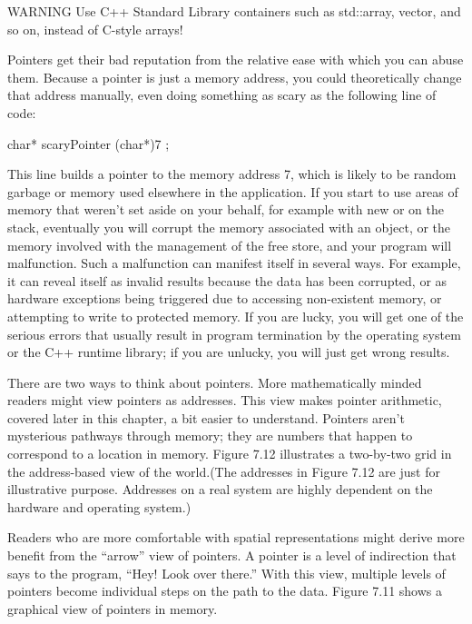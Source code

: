 \begin{myWarning}{WARNING}
Use C++ Standard Library containers such as std::array, vector, and so on, instead of C-style arrays!
\end{myWarning}


Pointers get their bad reputation from the relative ease with which you can abuse them. Because a pointer is just a memory address, you could theoretically change that address manually, even doing something as scary as the following line of code:

\begin{cpp}
char* scaryPointer { (char*)7 };
\end{cpp}

This line builds a pointer to the memory address 7, which is likely to be random garbage or memory used elsewhere in the application. If you start to use areas of memory that weren’t set aside on your behalf, for example with new or on the stack, eventually you will corrupt the memory associated with an object, or the memory involved with the management of the free store, and your program will malfunction. Such a malfunction can manifest itself in several ways. For example, it can reveal itself as invalid results because the data has been corrupted, or as hardware exceptions being triggered due to accessing non-existent memory, or attempting to write to protected memory. If you are lucky, you will get one of the serious errors that usually result in program termination by the operating system or the C++ runtime library; if you are unlucky, you will just get wrong results.


There are two ways to think about pointers. More mathematically minded readers might view pointers as addresses. This view makes pointer arithmetic, covered later in this chapter, a bit easier to understand. Pointers aren’t mysterious pathways through memory; they are numbers that happen to correspond to a location in memory. Figure 7.12 illustrates a two-by-two grid in the address-based view of the world.(The addresses in Figure 7.12 are just for illustrative purpose. Addresses on a real system are highly dependent on the hardware and operating system.)


Readers who are more comfortable with spatial representations might derive more benefit from the “arrow” view of pointers. A pointer is a level of indirection that says to the program, “Hey! Look over there.” With this view, multiple levels of pointers become individual steps on the path to the data. Figure 7.11 shows a graphical view of pointers in memory.

